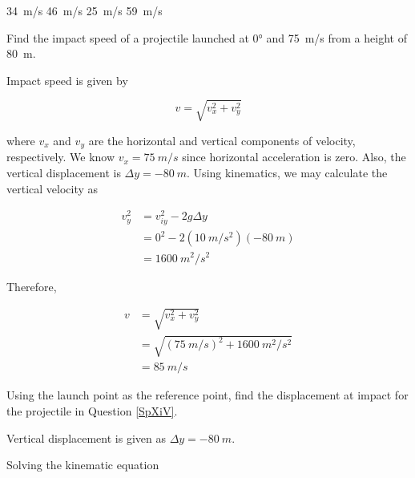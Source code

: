 \documentclass[../main-physics-workbook.tex]{subfiles}
\begin{document}
\begin{questions}
\begin{randomizechoices}
    \correctchoice \SI{34}{m/s}
    \choice \SI{46}{m/s}
    \choice \SI{25}{m/s}
    \choice \SI{59}{m/s}
\end{randomizechoices}

\question \label{SpXiV}
Find the impact speed of a projectile launched at \ang{0} and \SI{75}{m/s} from a height of \SI{80}{m}.


\begin{solutionorbox}[10cm]
Impact speed is given by

\begin{equation*}
    v = \sqrt{v_x^2 + v_y^2}
\end{equation*}

where $v_x$ and $v_y$ are the horizontal and vertical components of velocity, respectively. We know $v_x = \SI{75}{m/s}$ since horizontal acceleration is zero. Also, the vertical displacement is $\Delta y = -\SI{80}{m}$. Using kinematics, we may calculate the vertical velocity as

\begin{align*}
    v_y^2 &= v_{iy}^2 - 2g \Delta y \\[1ex]
    &= 0^2 - 2\left(\SI{10}{m/s^2}\right) \left(-\SI{80}{m}\right) \\[1ex]
    &= \SI{1600}{m^2/s^2}
\end{align*}

Therefore,

\begin{align*}
    v &= \sqrt{v_x^2 + v_y^2} \\[1ex]
    &= \sqrt{\left(\SI{75}{m/s}\right)^2 + \SI{1600}{m^2/s^2}} \\[1ex]
    &= \boxed{\SI{85}{m/s}}
\end{align*}
\end{solutionorbox}

\question
Using the launch point as the reference point, find the displacement at impact for the projectile in Question \ref{SpXiV}.

\begin{solutionorbox}[5cm]
Vertical displacement is given as $\Delta y = -\SI{80}{m}$. 

Solving the kinematic equation


\end{solutionorbox}
\end{questions}
\end{document}
